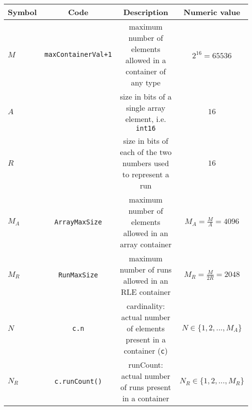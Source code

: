 \documentclass{standalone}
\begin{document}
{\def\arraystretch{1.25}\tabcolsep=10pt
\begin{tabular}{l | c | c | c}
  Symbol & Code & Description & Numeric value \\
  \hline
  $M$   & \texttt{maxContainerVal+1} & maximum number of elements allowed in a container of any type   & $2^{16} = 65536$ \\
  $A$   &                            & size in bits of a single array element, i.e. \texttt{int16}     & $16$ \\
  $R$   &                            & size in bits of each of the two numbers used to represent a run & $16$ \\
  $M_A$ & \texttt{ArrayMaxSize}      & maximum number of elements allowed in an array container        & $M_A = \frac{M}{A} = 4096$ \\
  $M_R$ & \texttt{RunMaxSize}        & maximum number of runs allowed in an RLE container              & $M_R = \frac{M}{2R} = 2048$ \\
  $N$   & \texttt{c.n}               & cardinality: actual number of elements present in a container (\texttt{c})   & $N \in \{1, 2, ..., M_A\}$ \\
  $N_R$ & \texttt{c.runCount()}      & runCount: actual number of runs present in a container          & $N_R \in \{1, 2, ..., M_R\}$ \\
\end{tabular}
}
\end{document}
